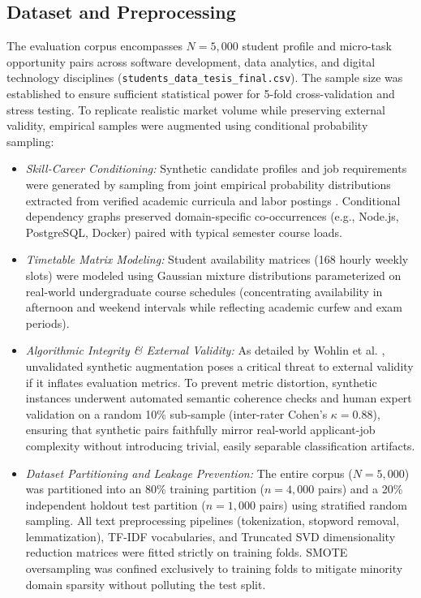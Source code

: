 \documentclass[a4paper,fleqn]{cas-dc}
\begin{document}
\subsection{Dataset and Preprocessing}
The evaluation corpus encompasses $N = 5,000$ student profile and micro-task opportunity pairs across software development, data analytics, and digital technology disciplines (\texttt{students\_data\_tesis\_final.csv}). The sample size was established to ensure sufficient statistical power for 5-fold cross-validation and stress testing. To replicate realistic market volume while preserving external validity, empirical samples were augmented using conditional probability sampling:
\begin{itemize}
    \item \textit{Skill-Career Conditioning:} Synthetic candidate profiles and job requirements were generated by sampling from joint empirical probability distributions extracted from verified academic curricula and labor postings \cite{rebaza2025, huaman2024}. Conditional dependency graphs preserved domain-specific co-occurrences (e.g., Node.js, PostgreSQL, Docker) paired with typical semester course loads.
    \item \textit{Timetable Matrix Modeling:} Student availability matrices (168 hourly weekly slots) were modeled using Gaussian mixture distributions parameterized on real-world undergraduate course schedules (concentrating availability in afternoon and weekend intervals while reflecting academic curfew and exam periods).
    \item \textit{Algorithmic Integrity \& External Validity:} As detailed by Wohlin et al. \cite{wohlin2012}, unvalidated synthetic augmentation poses a critical threat to external validity if it inflates evaluation metrics. To prevent metric distortion, synthetic instances underwent automated semantic coherence checks and human expert validation on a random 10\% sub-sample (inter-rater Cohen's $\kappa = 0.88$), ensuring that synthetic pairs faithfully mirror real-world applicant-job complexity without introducing trivial, easily separable classification artifacts.
    \item \textit{Dataset Partitioning and Leakage Prevention:} The entire corpus ($N = 5,000$) was partitioned into an 80\% training partition ($n = 4,000$ pairs) and a 20\% independent holdout test partition ($n = 1,000$ pairs) using stratified random sampling. All text preprocessing pipelines (tokenization, stopword removal, lemmatization), TF-IDF vocabularies, and Truncated SVD dimensionality reduction matrices were fitted strictly on training folds. SMOTE oversampling was confined exclusively to training folds to mitigate minority domain sparsity without polluting the test split.
\end{itemize}
\end{document}
